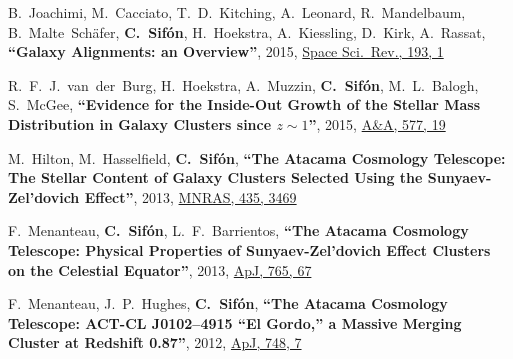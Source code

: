 \documentclass{article}
\def\myself{\textbf{\color{red} C.~Sif\'on}}
\def\aap{A\&A}
\def\apj{ApJ}
\def\mnras{MNRAS}
\def\ssr{Space Sci.\ Rev.}
\newcommand{\paper}[1]{\textbf{``#1''}}
\begin{document}
\begin{etaremune}
\item
B.~Joachimi, M.~Cacciato, T.~D.~Kitching, A.~Leonard, R.~Mandelbaum, B.~Malte~Sch\"afer, \myself, 
H.~Hoekstra, A.~Kiessling, D.~Kirk, A.~Rassat,
\paper{Galaxy Alignments: an Overview},
2015, \href{http://adsabs.harvard.edu/doi/10.1007/s11214-015-0177-4}{\ssr, 193, 1}

\item
R.~F.~J.~van~der~Burg, H.~Hoekstra, A.~Muzzin, \myself, M.~L.~Balogh, S.~McGee,
\paper{Evidence for the Inside-Out Growth of the Stellar Mass Distribution in Galaxy Clusters 
since $z\sim1$},
2015, \href{http://adsabs.harvard.edu/adsabs/abs/2015A&A...577A..19V}{\aap, 577, 19}

\item
M.~Hilton, M.~Hasselfield, \myself, 
\paper{The Atacama Cosmology Telescope: The Stellar Content of Galaxy Clusters Selected Using the 
Sunyaev-Zel'dovich Effect},
2013, \href{https://ui.adsabs.harvard.edu/#abs/2013MNRAS.435.3469H/abstract}{\mnras, 435, 3469}

\item
F.~Menanteau, \myself, L.~F.~Barrientos, 
\paper{The Atacama Cosmology Telescope: Physical Properties of Sunyaev-Zel'dovich Effect Clusters 
on the Celestial Equator},
2013, \href{https://ui.adsabs.harvard.edu/#abs/2013ApJ...765...67M/abstract}{\apj, 765, 67}

\item
F.~Menanteau, J.~P.~Hughes, \myself, 
\paper{The Atacama Cosmology Telescope: ACT-CL J0102--4915 ``El Gordo,'' a Massive
Merging Cluster at Redshift 0.87},
2012, \href{https://ui.adsabs.harvard.edu/#abs/2012ApJ...748....7M/abstract}{\apj, 748, 7}

\end{etaremune}
\end{document}
